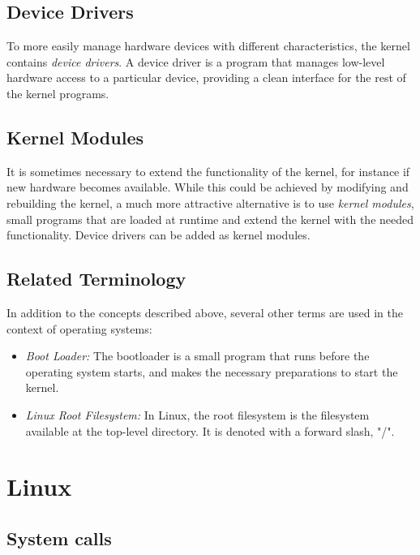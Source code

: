 \subsection{Device Drivers}
To more easily manage hardware devices with different characteristics, the kernel contains \emph{device drivers}. A device driver is a program that manages low-level hardware access to a particular device, providing a clean interface for the rest of the kernel programs.

\subsection{Kernel Modules}\label{sec:kernel-modules}
It is sometimes necessary to extend the functionality of the kernel, for instance if new hardware becomes available. While this could be achieved by modifying and rebuilding the kernel, a much more attractive alternative is to use \emph{kernel modules}, small programs that are loaded at runtime and extend the kernel with the needed functionality. Device drivers can be added as kernel modules.

\subsection{Related Terminology}
In addition to the concepts described above, several other terms are used in the context of operating systems:
\begin{itemize}
\item \textsl{Boot Loader:} The bootloader is a small program that runs before the operating system starts, and makes the necessary preparations to start the kernel.
\item \textsl{Linux Root Filesystem:} In Linux, the root filesystem is the filesystem available at the top-level directory. It is denoted with a forward slash, "/".
\end{itemize}



\section{Linux}

\subsection{System calls}

